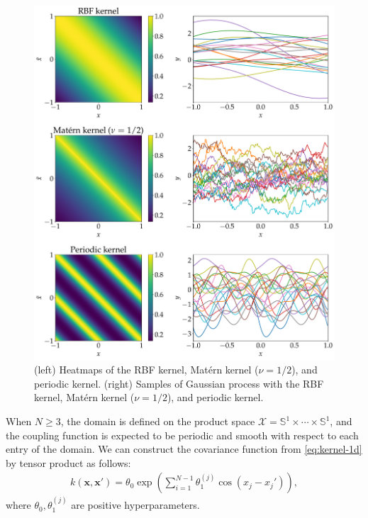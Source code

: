 \begin{figure}[htbp]
    \centering
    \includegraphics[width=\textwidth]{figs/kernel_comparison.pdf}
    \caption{
    (left) Heatmaps of the RBF kernel, Matérn kernel ($\nu=1/2$), and periodic kernel. (right) Samples of Gaussian process with the RBF kernel, Matérn kernel ($\nu=1/2$), and periodic kernel.
    }
    \label{fig:kernel-comparison}
\end{figure}

When $N\geq3$, the domain is defined on the product space $\mathcal{X}=\mathbb{S}^{1}\times\cdots\times\mathbb{S}^{1}$,
and the coupling function is expected to be periodic and smooth with respect to each entry of the domain.
We can construct the covariance function from \eqref{eq:kernel-1d} by tensor product as follows:
\begin{align}
    k(\bm{x},\bm{x}')=\theta_{0}\exp\left(\sum_{i=1}^{N-1}\theta_{1}^{(j)}\cos(x_{j}-x_{j}')\right),
\end{align}
where $\theta_{0},\theta_{1}^{(j)}$ are positive hyperparameters.

